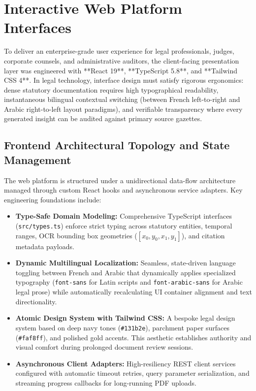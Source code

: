 \documentclass[12pt,a4paper]{report}
\begin{document}
\section{Interactive Web Platform Interfaces}
To deliver an enterprise-grade user experience for legal professionals, judges, corporate counsels, and administrative auditors, the client-facing presentation layer was engineered with **React 19**, **TypeScript 5.8**, and **Tailwind CSS 4**. In legal technology, interface design must satisfy rigorous ergonomics: dense statutory documentation requires high typographical readability, instantaneous bilingual contextual switching (between French left-to-right and Arabic right-to-left layout paradigms), and verifiable transparency where every generated insight can be audited against primary source gazettes.

\subsection{Frontend Architectural Topology and State Management}
The web platform is structured under a unidirectional data-flow architecture managed through custom React hooks and asynchronous service adapters. Key engineering foundations include:
\begin{itemize}[leftmargin=20pt, itemsep=3pt]
    \item \textbf{Type-Safe Domain Modeling:} Comprehensive TypeScript interfaces (\texttt{src/types.ts}) enforce strict typing across statutory entities, temporal ranges, OCR bounding box geometries ($[x_0, y_0, x_1, y_1]$), and citation metadata payloads.
    \item \textbf{Dynamic Multilingual Localization:} Seamless, state-driven language toggling between French and Arabic that dynamically applies specialized typography (\texttt{font-sans} for Latin scripts and \texttt{font-arabic-sans} for Arabic legal prose) while automatically recalculating UI container alignment and text directionality.
    \item \textbf{Atomic Design System with Tailwind CSS:} A bespoke legal design system based on deep navy tones (\texttt{\#131b2e}), parchment paper surfaces (\texttt{\#faf8ff}), and polished gold accents. This aesthetic establishes authority and visual comfort during prolonged document review sessions.
    \item \textbf{Asynchronous Client Adapters:} High-resiliency REST client services configured with automatic timeout retries, query parameter serialization, and streaming progress callbacks for long-running PDF uploads.
\end{itemize}
\end{document}
